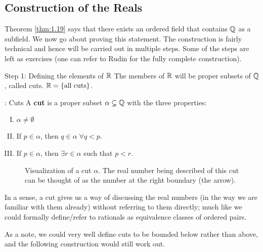 \subsection{Construction of the Reals}
Theorem \ref{thm:1.19} says that there exists an ordered field that contains $\mathbb{Q}$ as a subfield. We now go about proving this statement. The construction is fairly technical and hence will be carried out in multiple steps. Some of the steps are left as exercises (one can refer to Rudin for the fully complete construction).

\begin{nblank}{Step 1: Defining the elements of $\mathbb{R}$}
    The members of $\mathbb{R}$ will be proper subsets of $\mathbb{Q}$, called cuts. $\mathbb{R} = \set{\text{all cuts}}$. 
    \begin{ndef}{: Cuts}
        A \textbf{cut} is a proper subset $\alpha \subsetneq \mathbb{Q}$ with the three properties:
        \begin{enumerate}[(I)]
            \item $\alpha \neq \emptyset$
            \item If $p \in \alpha$, then $q \in \alpha \; \forall q < p$. 
            \item If $p \in \alpha$, then $\exists r \in \alpha$ such that $p < r$. 
        \end{enumerate}
    \end{ndef}
\end{nblank}
\begin{figure}[htbp]
    \centering
    \caption{Visualization of a cut $\alpha$. The real number being described of this cut can be thought of as the number at the right boundary (the arrow).}
    \label{fig2} 
\end{figure}
\noindent In a sense, a cut gives us a way of discussing the real numbers (in the way we are familiar with them already) without referring to them directly; much like we could formally define/refer to rationals as equivalence classes of ordered pairs.  

\noindent As a note, we could very well define cuts to be bounded below rather than above, and the following construction would still work out.

